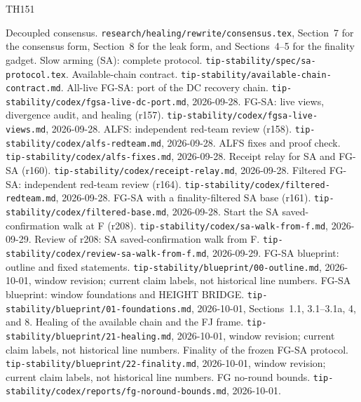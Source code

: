 \documentclass{article}
\theoremstyle{plain}
\theoremstyle{definition}
\theoremstyle{remark}
\begin{document}
\begin{thebibliography}{TH151}
\raggedright
{}
  Decoupled consensus.
  \nolinkurl{research/healing/rewrite/consensus.tex}, Section~7 for the
  consensus form, Section~8 for the leak form, and Sections~4--5
  for the finality gadget.
  Slow arming (SA): complete protocol.
  \nolinkurl{tip-stability/spec/sa-protocol.tex}.
  Available-chain contract.
  \nolinkurl{tip-stability/available-chain-contract.md}.
  All-live FG-SA: port of the DC recovery chain.
  \nolinkurl{tip-stability/codex/fgsa-live-dc-port.md}, 2026-09-28.
  FG-SA: live views, divergence audit, and healing (r157).
  \nolinkurl{tip-stability/codex/fgsa-live-views.md}, 2026-09-28.
  ALFS: independent red-team review (r158).
  \nolinkurl{tip-stability/codex/alfs-redteam.md}, 2026-09-28.
  ALFS fixes and proof check.
  \nolinkurl{tip-stability/codex/alfs-fixes.md}, 2026-09-28.
  Receipt relay for SA and FG-SA (r160).
  \nolinkurl{tip-stability/codex/receipt-relay.md}, 2026-09-28.
  Filtered FG-SA: independent red-team review (r164).
  \nolinkurl{tip-stability/codex/filtered-redteam.md}, 2026-09-28.
  FG-SA with a finality-filtered SA base (r161).
  \nolinkurl{tip-stability/codex/filtered-base.md}, 2026-09-28.
  Start the SA saved-confirmation walk at F (r208).
  \nolinkurl{tip-stability/codex/sa-walk-from-f.md}, 2026-09-29.
  Review of r208: SA saved-confirmation walk from F.
  \nolinkurl{tip-stability/codex/review-sa-walk-from-f.md}, 2026-09-29.
  FG-SA blueprint: outline and fixed statements.
  \nolinkurl{tip-stability/blueprint/00-outline.md}, 2026-10-01, window revision;
  current claim labels, not historical line numbers.
  FG-SA blueprint: window foundations and HEIGHT BRIDGE.
  \nolinkurl{tip-stability/blueprint/01-foundations.md}, 2026-10-01,
  Sections~1.1, 3.1--3.1a, 4, and 8.
  Healing of the available chain and the FJ frame.
  \nolinkurl{tip-stability/blueprint/21-healing.md}, 2026-10-01, window revision;
  current claim labels, not historical line numbers.
  Finality of the frozen FG-SA protocol.
  \nolinkurl{tip-stability/blueprint/22-finality.md}, 2026-10-01, window revision;
  current claim labels, not historical line numbers.
  FG no-round bounds.
  \nolinkurl{tip-stability/codex/reports/fg-noround-bounds.md}, 2026-10-01.

\end{thebibliography}
\end{document}
